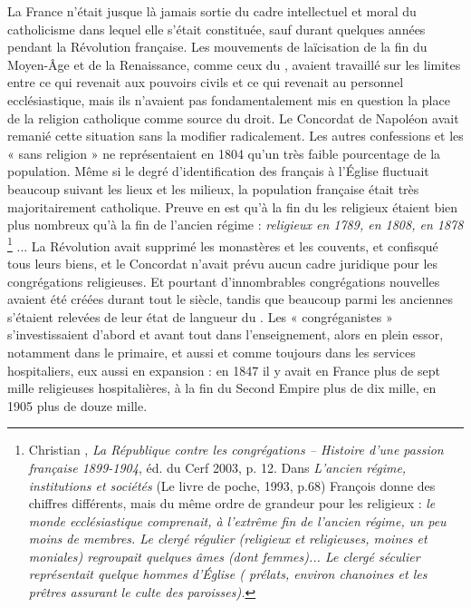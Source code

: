 
 La France n'était jusque là jamais sortie du cadre intellectuel et moral du catholicisme dans lequel elle s'était constituée, sauf durant quelques années pendant la Révolution française. Les mouvements de laïcisation de la fin du Moyen-Âge et de la Renaissance, comme ceux du , avaient travaillé sur les limites entre ce qui revenait aux pouvoirs civils et ce qui revenait au personnel ecclésiastique, mais ils n'avaient pas fondamentalement mis en question la place de la religion catholique comme source du droit. Le Concordat de \hbox{Napoléon} avait remanié cette situation sans la modifier radicalement. Les autres confessions et les « sans religion » ne représentaient en 1804 qu'un très faible pourcentage de la population. Même si le degré d'identification des français à l'Église fluctuait beaucoup suivant les lieux et les milieux, la population française était très majoritairement catholique. Preuve en est qu'à la fin du  les religieux étaient bien plus nombreux qu'à la fin de l'ancien régime : {\emph{ religieux en 1789,  en 1808,  en 1878}%
\footnote{Christian , \emph{La République contre les congrégations – Histoire d'une passion française 1899-1904}, éd. du Cerf 2003, p. 12. Dans \emph{L'ancien régime, institutions et sociétés} (Le livre de poche, 1993, p.68) François  donne des chiffres différents, mais du même ordre de grandeur pour les religieux : \emph{le monde ecclésiastique comprenait, à l'extrême fin de l'ancien régime, un peu moins de  membres. Le clergé régulier (religieux et religieuses, moines et moniales) regroupait quelques  âmes (dont  femmes)... Le clergé séculier représentait quelque  hommes d'Église ( prélats, environ  chanoines et les  prêtres assurant le culte des  paroisses).}}%
}... La Révolution avait supprimé les monastères et les couvents, et confisqué tous leurs biens, et le Concordat n'avait prévu aucun cadre juridique pour les congrégations religieuses. Et pourtant d'innombrables congrégations nouvelles avaient été créées durant tout le siècle, tandis que beaucoup parmi les anciennes s'étaient relevées de leur état de langueur du . Les « congréganistes » s'investissaient d'abord et avant tout dans l'enseignement, alors en plein essor, notamment dans le primaire, et aussi et comme toujours dans les services hospitaliers, eux aussi en expansion : en 1847 il y avait en France plus de sept mille religieuses hospitalières, à la fin du Second Empire plus de dix mille, en 1905 plus de douze mille.

